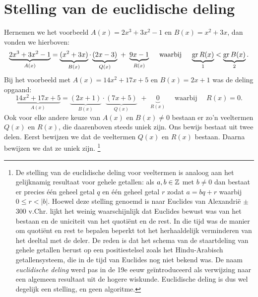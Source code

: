 \documentclass{ximera}
\begin{document}
	\author{Koen De Naeghel}
	\label{xim:veeltermen_stelling_van_de_euclidische_deling}

\section{Stelling van de euclidische deling}

Hernemen we het voorbeeld $A(x) = 2x^3+3x^2-1$ en $B(x) = x^2+3x$, dan vonden we hierboven:
\[
\underbrace{2x^3+3x^2-1}_{A(x)} = \underbrace{(x^2+3x)}_{B(x)}\cdot\underbrace{(2x-3)}_{Q(x)} \,\, + \,\, \underbrace{9x-1}_{R(x)} \quad \text{ waarbij } \quad \underbrace{\operatorname{gr} R(x)}_{1} < \underbrace{\operatorname{gr} B(x)}_{2}.
\]
Bij het voorbeeld met $A(x) = 14x^2+17x+5$ en $B(x) = 2x+1$ was de deling opgaand:
\[
\underbrace{14x^2+17x+5}_{A(x)} = \underbrace{(2x+1)}_{B(x)}\cdot\underbrace{(7x+5)}_{Q(x)} \,\, + \,\, \underbrace{0}_{R(x)} \quad \text{ waarbij } \quad R(x) = 0.
\]
Ook voor elke andere keuze van $A(x)$ en $B(x) \neq 0$ bestaan er zo'n veeltermen $Q(x)$ en $R(x)$, die daarenboven steeds uniek zijn. Ons bewijs bestaat uit twee delen. Eerst bewijzen we dat de veeltermen $Q(x)$ en $R(x)$ bestaan. Daarna bewijzen we dat ze uniek zijn. \footnote{De stelling van de euclidische deling voor veeltermen is analoog aan het gelijknamig resultaat voor gehele getallen: als $a,b \in \mathbb{Z}$ met $b \neq 0$ dan bestaat er precies \'e\'en geheel getal $q$ en \'e\'en geheel getal $r$ zodat $a = bq + r$ waarbij $0 \leq r < \left|b\right|$. Hoewel deze stelling genoemd is naar Euclides van Alexandri\"e $\pm$300 v.Chr. lijkt het weinig waarschijnlijk dat Euclides bewust was van het bestaan en de uniciteit van het quoti\"ent en de rest. In die tijd was de manier om quoti\"ent en rest te bepalen beperkt tot het herhaaldelijk verminderen van het deeltal met de deler. De reden is dat het schema van de staartdeling van gehele getallen berust op een positiestelsel zoals het Hindu-Arabisch getallensysteem, die in de tijd van Euclides nog niet bekend was. De naam {\em euclidische deling} werd pas in de 19e eeuw ge\"introduceerd als verwijzing naar een algemeen resultaat uit de hogere wiskunde. Euclidische deling is dus wel degelijk een stelling, en geen algoritme.}
\end{document}
